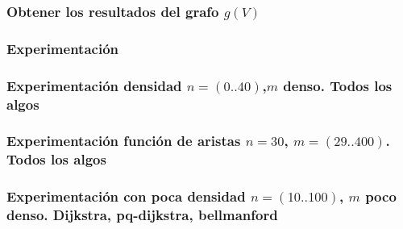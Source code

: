 \documentclass[12pt]{article}
\begin{document}
\subsubsection{Obtener los resultados del grafo $g(V)$}

\subsubsection{Experimentación}

\subsubsection{Experimentación densidad $n=(0..40)$,$m$ denso. Todos los algos}

\subsubsection{Experimentación función de aristas $n = 30$, $m=(29..400)$. Todos los algos}

\subsubsection{Experimentación con poca densidad $n=(10..100)$, $m$ poco denso. Dijkstra, pq-dijkstra, bellmanford}
\end{document}
